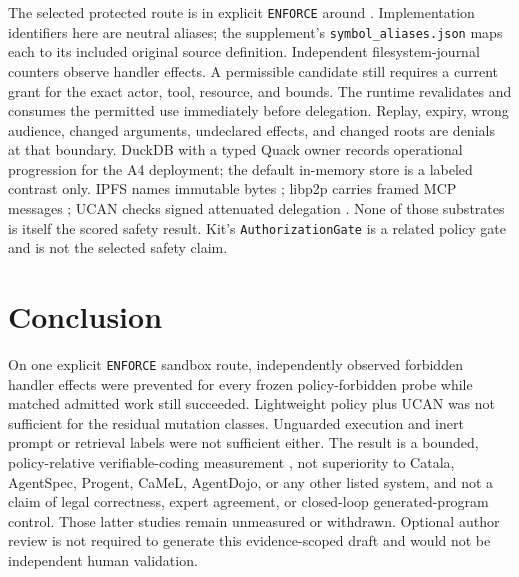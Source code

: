 \documentclass{article}
\begin{document}
The selected protected route is  in explicit \texttt{ENFORCE} around . Implementation identifiers here are neutral aliases; the supplement's \texttt{symbol\_aliases.json} maps each to its included original source definition. Independent filesystem-journal counters observe handler effects. A permissible candidate still requires a current grant for the exact actor, tool, resource, and bounds. The runtime revalidates and consumes the permitted use immediately before delegation. Replay, expiry, wrong audience, changed arguments, undeclared effects, and changed roots are denials at that boundary. DuckDB with a typed Quack owner records operational progression for the A4 deployment; the default in-memory store is a labeled contrast only. IPFS names immutable bytes \citep{ipfs}; libp2p carries framed MCP messages \citep{libp2p}; UCAN checks signed attenuated delegation \citep{ucan}. None of those substrates is itself the scored safety result. Kit's \texttt{AuthorizationGate} is a related policy gate and is not the selected safety claim.




\section{Conclusion}

On one explicit \texttt{ENFORCE} sandbox route, independently observed forbidden handler effects were prevented for every frozen policy-forbidden probe while matched admitted work still succeeded. Lightweight policy plus UCAN was not sufficient for the residual mutation classes. Unguarded execution and inert prompt or retrieval labels were not sufficient either. The result is a bounded, policy-relative verifiable-coding measurement \citep{vericode2026cfp}, not superiority to Catala, AgentSpec, Progent, CaMeL, AgentDojo, or any other listed system, and not a claim of legal correctness, expert agreement, or closed-loop generated-program control. Those latter studies remain unmeasured or withdrawn. Optional author review is not required to generate this evidence-scoped draft and would not be independent human validation.\label{la-main-text-end}

\clearpage


\clearpage
\appendix
\end{document}
